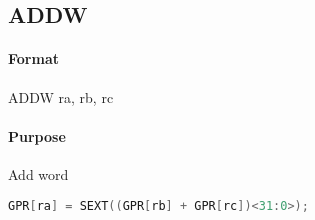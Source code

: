 \subsection{ADDW}


\paragraph{Format} ADDW ra, rb, rc

\paragraph{Purpose} Add word

\begin{lstlisting}[language=c]
    GPR[ra] = SEXT((GPR[rb] + GPR[rc])<31:0>);
\end{lstlisting}
